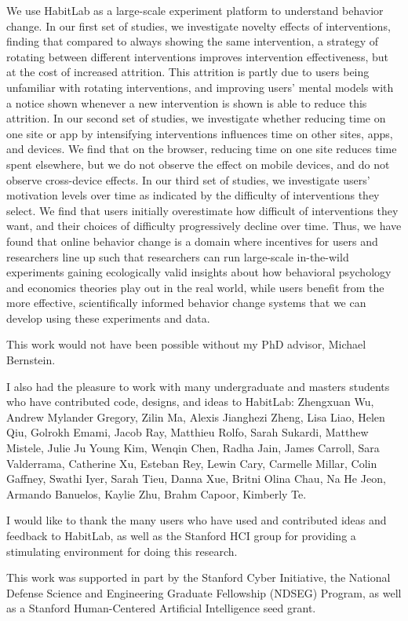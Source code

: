 We use HabitLab as a large-scale experiment platform to understand behavior change. In our first set of studies, we investigate novelty effects of interventions, finding that compared to always showing the same intervention, a strategy of rotating between different interventions improves intervention effectiveness, but at the cost of increased attrition. This attrition is partly due to users being unfamiliar with rotating interventions, and improving users' mental models with a notice shown whenever a new intervention is shown is able to reduce this attrition. In our second set of studies, we investigate whether reducing time on one site or app by intensifying interventions influences time on other sites, apps, and devices. We find that on the browser, reducing time on one site reduces time spent elsewhere, but we do not observe the effect on mobile devices, and do not observe cross-device effects. In our third set of studies, we investigate users' motivation levels over time as indicated by the difficulty of interventions they select. We find that users initially overestimate how difficult of interventions they want, and their choices of difficulty progressively decline over time. Thus, we have found that online behavior change is a domain where incentives for users and researchers line up such that researchers can run large-scale in-the-wild experiments gaining ecologically valid insights about how behavioral psychology and economics theories play out in the real world, while users benefit from the more effective, scientifically informed behavior change systems that we can develop using these experiments and data.



This work would not have been possible without my PhD advisor, Michael Bernstein.

I also had the pleasure to work with many undergraduate and masters students who have contributed code, designs, and ideas to HabitLab: Zhengxuan Wu, Andrew Mylander Gregory, Zilin Ma, Alexis Jianghezi Zheng, Lisa Liao, Helen Qiu, Golrokh Emami, Jacob Ray, Matthieu Rolfo, Sarah Sukardi, Matthew Mistele, Julie Ju Young Kim, Wenqin Chen, Radha Jain, James Carroll, Sara Valderrama, Catherine Xu, Esteban Rey, Lewin Cary, Carmelle Millar, Colin Gaffney, Swathi Iyer, Sarah Tieu, Danna Xue, Britni Olina Chau, Na He Jeon, Armando Banuelos, Kaylie Zhu, Brahm Capoor, Kimberly Te.

I would like to thank the many users who have used and contributed ideas and feedback to HabitLab, as well as the Stanford HCI group for providing a stimulating environment for doing this research.

This work was supported in part by the Stanford Cyber Initiative, the National Defense Science and Engineering Graduate Fellowship (NDSEG) Program, as well as a Stanford Human-Centered Artificial Intelligence seed grant. %

\afterpreface